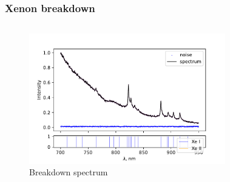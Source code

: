 \documentclass{beamer}
\begin{document}
	\begin{frame}
		\frametitle{Xenon breakdown}
		\begin{columns}
			\begin{figure}
				\centering
				\includegraphics[width=1.1\linewidth]{gen/xe_lines_spherical.pdf}
				\caption*{Breakdown spectrum}
			\end{figure}	
			\begin{figure}
				\centering

\end{figure}
\end{columns}
\end{frame}
\end{document}
